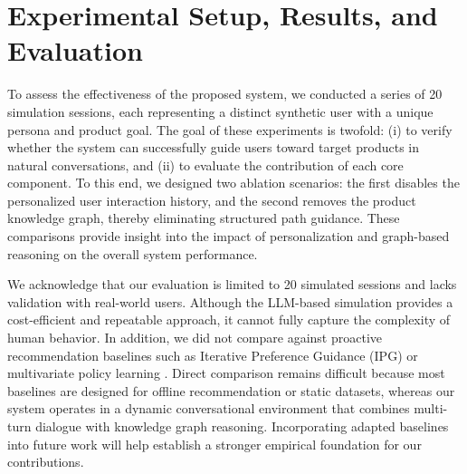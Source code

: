 \section{Experimental Setup, Results, and Evaluation}\label{sec:evaluation}

To assess the effectiveness of the proposed system, we conducted a series of 20 simulation sessions, each representing a distinct synthetic user with a unique persona and product goal. The goal of these experiments is twofold: (i) to verify whether the system can successfully guide users toward target products in natural conversations, and (ii) to evaluate the contribution of each core component. To this end, we designed two ablation scenarios: the first disables the personalized user interaction history, and the second removes the product knowledge graph, thereby eliminating structured path guidance. These comparisons provide insight into the impact of personalization and graph-based reasoning on the overall system performance.

We acknowledge that our evaluation is limited to 20 simulated sessions and lacks validation with real-world users. Although the LLM-based simulation provides a cost-efficient and repeatable approach, it cannot fully capture the complexity of human behavior. In addition, we did not compare against proactive recommendation baselines such as Iterative Preference Guidance (IPG) \cite{bi2024proactive} or multivariate policy learning \cite{jeunen2024multi}. Direct comparison remains difficult because most baselines are designed for offline recommendation or static datasets, whereas our system operates in a dynamic conversational environment that combines multi-turn dialogue with knowledge graph reasoning. Incorporating adapted baselines into future work will help establish a stronger empirical foundation for our contributions.




